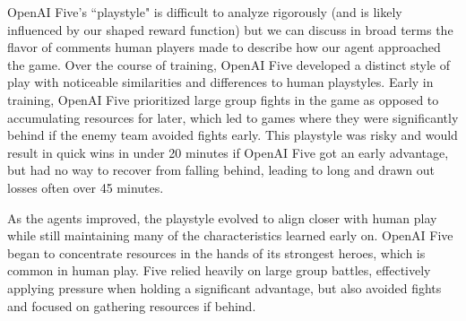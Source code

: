 \documentclass[11pt]{article}
\newcommand{\openaifive}{OpenAI Five\xspace}
\begin{document}
\openaifive's ``playstyle" is difficult to analyze rigorously (and is likely influenced by our shaped reward function) but we can discuss in broad terms the flavor of comments human players made to describe how our agent approached the game.
Over the course of training, \openaifive developed a distinct style of play with noticeable similarities and differences to human playstyles.
Early in training, \openaifive prioritized large group fights in the game as opposed to accumulating resources for later, which led to games where they were significantly behind if the enemy team avoided fights early.
This playstyle was risky and would result in quick wins in under 20 minutes if \openaifive got an early advantage, but had no way to recover from falling behind, leading to long and drawn out losses often over 45 minutes.

As the agents improved, the playstyle evolved to align closer with human play while still maintaining many of the characteristics learned early on. 
\openaifive began to concentrate resources in the hands of its strongest heroes, which is common in human play. Five relied heavily on large group battles, effectively applying pressure when holding a significant advantage, but also avoided fights and focused on gathering resources if behind.
\end{document}
